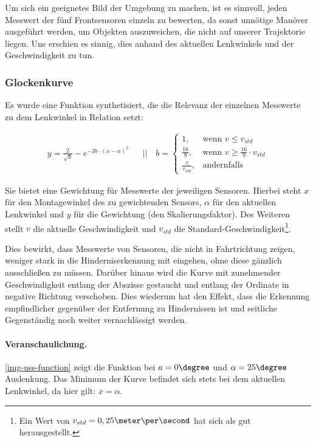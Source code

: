 \documentclass[a4paper,12pt]{report}
\begin{document}
	Um sich ein geeignetes Bild der Umgebung zu machen, ist es sinnvoll, jeden  Messwert der fünf Frontsensoren einzeln zu bewerten, da sonst unnötige Manöver ausgeführt werden, um Objekten auszuweichen, die nicht auf unserer Trajektorie liegen.
	Uns erschien es sinnig, dies anhand des aktuellen Lenkwinkels und der Geschwindigkeit zu tun.

\subsubsection{Glockenkurve}

	Es wurde eine Funktion synthetisiert, die die Relevanz der einzelnen Messwerte zu dem Lenkwinkel in Relation setzt:

	\begin{align*}
		y=\frac{2}{\sqrt{b}} - e^{-3b \cdot \left( x-\alpha \right)^2}
		&&||\quad b=
		\begin{cases}
			1,					& \text{wenn } v \leq v_{std} \\
			\frac{16}{9},		& \text{wenn } v \geq \frac{16}{9} \cdot v_{std} \\
			\frac{v}{v_{std}}, 	& \text{andernfalls}
		\end{cases}
	\end{align*}


	Sie bietet eine Gewichtung für Messwerte der jeweiligen Sensoren.
	Hierbei steht $x$ für den Montagewinkel des zu gewichtenden Sensors, $\alpha$ für den aktuellen Lenkwinkel und $y$ für die Gewichtung (den Skalierungsfaktor).
	Des Weiteren stellt $v$ die aktuelle Geschwindigkeit und $v_{std}$ die Standard-Geschwindigkeit\footnote{Ein Wert von $v_{std} = 0,25\meter\per\second$ hat sich als gut herausgestellt.}.

	Dies bewirkt, dass Messwerte von Sensoren, die nicht in Fahrtrichtung zeigen, weniger stark in die Hinderniserkennung mit eingehen, ohne diese gänzlich ausschließen zu müssen.
	Darüber hinaus wird die Kurve mit zunehmender Geschwindigkeit entlang der Abszisse gestaucht und entlang der Ordinate in negative Richtung verschoben.
	Dies wiederum hat den Effekt, dass die Erkennung empfindlicher gegenüber der Entfernung zu Hindernissen ist und seitliche Gegenständig noch weiter vernachlässigt werden.

	\paragraph{Veranschaulichung.} \autoref{img-uss-function} zeigt die Funktion bei $a = 0\degree$ und $\alpha = 25\degree$ Auslenkung.
	Das Minimum der Kurve befindet sich stets bei dem aktuellen Lenkwinkel, da hier gilt: $x = \alpha$.
\end{document}
